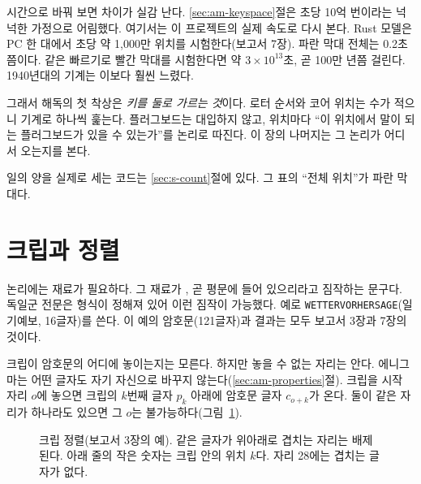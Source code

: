 시간으로 바꿔 보면 차이가 실감 난다. \ref{sec:am-keyspace}절은 초당 10억 번이라는 넉넉한 가정으로 어림했다. 여기서는
이 프로젝트의 실제 속도로 다시 본다. Rust 모델은 PC 한 대에서 초당 약 1,000만 위치를 시험한다(보고서 7장).
파란 막대 전체는 0.2초쯤이다. 같은 빠르기로 빨간 막대를 시험한다면 약 $3 \times 10^{13}$초, 곧 100만 년쯤
걸린다. 1940년대의 기계는 이보다 훨씬 느렸다.

그래서 해독의 첫 착상은 \emph{키를 둘로 가르는 것}이다. 로터 순서와 코어 위치는 수가 적으니 기계로 하나씩 훑는다.
플러그보드는 대입하지 않고, 위치마다 ``이 위치에서 말이 되는 플러그보드가 있을 수 있는가''를 논리로 따진다.
이 장의 나머지는 그 논리가 어디서 오는지를 본다.

\Ours 일의 양을 실제로 세는 코드는 \ref{sec:s-count}절에 있다. 그 표의 ``전체 위치''가 파란 막대다.

\section{크립과 정렬}\label{sec:ac-crib}

논리에는 재료가 필요하다. 그 재료가 , 곧 평문에 들어 있으리라고 짐작하는 문구다. 독일군 전문은
형식이 정해져 있어 이런 짐작이 가능했다. 예로 \texttt{WETTERVORHERSAGE}(일기예보, 16글자)를 쓴다. 이 예의
암호문(121글자)과 결과는 모두 보고서 3장과 7장의 것이다.

크립이 암호문의 어디에 놓이는지는 모른다. 하지만 놓을 수 없는 자리는 안다. 에니그마는 어떤 글자도 자기 자신으로
바꾸지 않는다(\ref{sec:am-properties}절). 크립을 시작 자리 $o$에 놓으면 크립의 $k$번째 글자 $p_k$ 아래에 암호문 글자
$c_{o+k}$가 온다. 둘이 같은 자리가 하나라도 있으면 그 $o$는 불가능하다(그림~\ref{fig:ac-align}).

\begin{figure}[ht]
\centering
{}
\caption{크립 정렬(보고서 3장의 예). 같은 글자가 위아래로 겹치는 자리는 배제된다. 아래 줄의 작은 숫자는 크립 안의
위치 $k$다. 자리 28에는 겹치는 글자가 없다.}
\label{fig:ac-align}
\end{figure}

